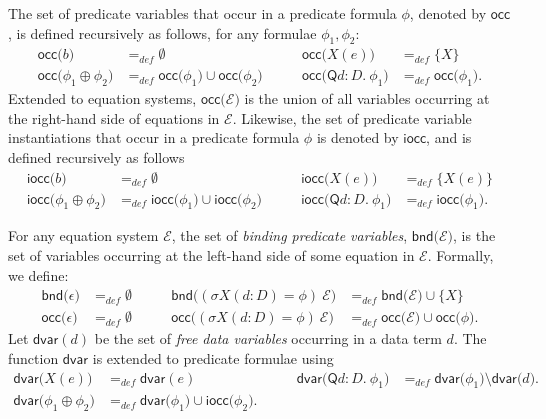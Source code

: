\documentclass{article}
\begin{document}
The set of predicate variables that occur in a predicate formula $\phi $,
denoted by $\mathsf{occ}$, is defined recursively as follows, for any
formulae $\phi _{1},\phi _{2}$: 
\begin{equation*}
\begin{array}{llll}
\mathsf{occ(}{b)} & =_{def}\emptyset & \mathsf{occ(}{X(e))} & =_{def}\{X\}
\\ 
\mathsf{occ(}{\phi _{1}\oplus \phi _{2})} & =_{def}\mathsf{occ(}{\phi _{1})}%
\cup \mathsf{occ(}{\phi _{2})}\qquad & \mathsf{occ}(\mathsf{Q}d:D{.~\phi
_{1})} & =_{def}\mathsf{occ(}{\phi _{1})}.%
\end{array}%
\end{equation*}%
Extended to equation systems, $\mathsf{occ}{(}\mathcal{E}{)}$ is the union
of all variables occurring at the right-hand side of equations in $\mathcal{E%
}$. Likewise, the set of predicate variable instantiations that occur in a
predicate formula $\phi $ is denoted by $\mathsf{iocc}$, and is defined
recursively as follows%
\begin{equation*}
\begin{array}{llll}
\mathsf{iocc(}{b)} & =_{def}\emptyset & \mathsf{iocc(}{X(e))} & 
=_{def}\{X(e)\} \\ 
\mathsf{iocc(}{\phi _{1}\oplus \phi _{2})} & =_{def}\mathsf{iocc(}{\phi _{1})%
}\cup \mathsf{iocc(}{\phi _{2})}\qquad & \mathsf{iocc}(\mathsf{Q}d:D{.~\phi
_{1})} & =_{def}\mathsf{iocc(}{\phi _{1})}.%
\end{array}%
\end{equation*}

For any equation system $\mathcal{E}$, the set of \emph{binding predicate
variables}, $\mathsf{bnd(}\mathcal{E})$, is the set of variables occurring
at the left-hand side of some equation in $\mathcal{E}$. Formally, we
define: 
\begin{equation*}
\begin{array}{llll}
\mathsf{bnd(}{\epsilon )} & =_{def}\emptyset \qquad & \mathsf{bnd(}{(\sigma
X(d{:}D)=\phi )~\mathcal{E)}} & =_{def}\mathsf{bnd(}{\mathcal{E)}}\cup \{X\}
\\ 
\mathsf{occ(}{\epsilon )} & =_{def}\emptyset \qquad & \mathsf{occ(}{(\sigma
X(d{:}D)=\phi )~\mathcal{E)}} & =_{def}\mathsf{occ(}{\mathcal{E)}}\cup 
\mathsf{occ(}{\phi )}.%
\end{array}%
\end{equation*}%
Let $\mathsf{dvar}(d)$ be the set of \emph{free data variables} occurring in
a data term $d$. The function $\mathsf{dvar}$ is extended to predicate
formulae using%
\begin{equation*}
\begin{array}{llll}
\mathsf{dvar(}{X(e))} & =_{def}\mathsf{dvar}(e) & \mathsf{dvar}(\mathsf{Q}d:D%
{.~\phi _{1})} & =_{def}\mathsf{dvar(}{\phi _{1})}\setminus \mathsf{dvar(}d{)%
}. \\ 
\mathsf{dvar(}{\phi _{1}\oplus \phi _{2})} & =_{def}\mathsf{dvar(}{\phi _{1})%
}\cup \mathsf{iocc(}{\phi _{2}).}\qquad &  & 
\end{array}%
\end{equation*}
\end{document}
